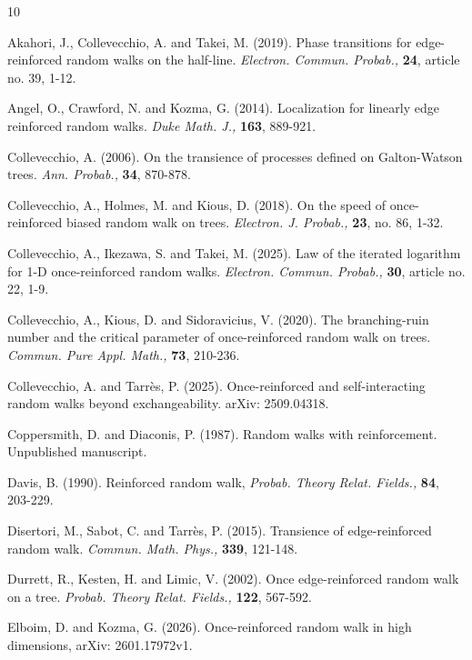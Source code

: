 \documentclass[12pt]{article}
\numberwithin{equation}{section}
\begin{document}
\begin{thebibliography}{10}

 Akahori, J., Collevecchio, A. and Takei, M. (2019). Phase transitions for edge-reinforced random walks on the half-line. {\it Electron. Commun. Probab.,} {\bf 24},
article no. 39, 1-12.

 Angel, O., Crawford, N. and Kozma, G. (2014). Localization for linearly edge reinforced random walks. {\it Duke Math. J.,} {\bf 163}, 889-921.



 Collevecchio, A. (2006). On the transience of processes defined on Galton-Watson trees.
{\it Ann. Probab.,} {\bf 34}, 870-878.

 Collevecchio, A., Holmes, M. and Kious, D. (2018). On the speed of once-reinforced biased random walk on trees. {\it Electron. J. Probab.,} {\bf 23},
no. 86, 1-32.

 Collevecchio, A., Ikezawa, S. and Takei, M. (2025). Law of the iterated logarithm for 1-D once-reinforced random walks. {\it Electron. Commun. Probab.,} {\bf 30},
article no. 22, 1-9.

 Collevecchio, A., Kious, D. and Sidoravicius, V. (2020). The
branching-ruin number and the critical parameter of once-reinforced
random walk on trees. {\it Commun. Pure Appl. Math.,} {\bf 73}, 210-236.



  Collevecchio, A. and Tarr\`{e}s, P. (2025). Once-reinforced and self-interacting random walks beyond exchangeability. arXiv: 2509.04318.



 Coppersmith, D. and Diaconis, P. (1987). Random walks with reinforcement. Unpublished
manuscript.

 Davis, B. (1990). Reinforced random walk, {\it Probab. Theory Relat. Fields.,} {\bf 84},
    203-229.
    
 Disertori, M., Sabot, C. and Tarr\`{e}s, P. (2015). Transience of edge-reinforced random walk. {\it Commun. Math. Phys.,} {\bf 339}, 121-148.

 Durrett, R., Kesten, H. and Limic, V. (2002). Once edge-reinforced random walk on a tree. {\it Probab. Theory Relat. Fields.,} {\bf 122}, 567-592.



 Elboim, D. and Kozma, G. (2026). Once-reinforced random walk in high dimensions, arXiv: 2601.17972v1.


\end{thebibliography}
\end{document}
